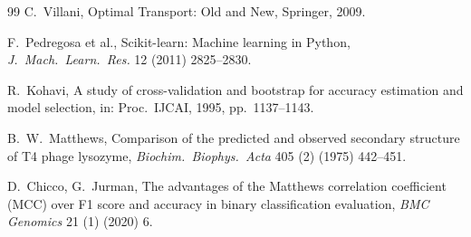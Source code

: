 \documentclass[preprint,12pt,authoryear]{elsarticle}
\begin{document}
\begin{thebibliography}{99}
C.~Villani, Optimal Transport: Old and New, Springer, 2009.

F.~Pedregosa et al., Scikit-learn: Machine learning in Python, \textit{J.\ Mach.\
Learn.\ Res.} 12 (2011) 2825--2830.

R.~Kohavi, A study of cross-validation and bootstrap for accuracy estimation and
model selection, in: Proc.\ IJCAI, 1995, pp.~1137--1143.

B.~W.~Matthews, Comparison of the predicted and observed secondary structure of T4
phage lysozyme, \textit{Biochim.\ Biophys.\ Acta} 405 (2) (1975) 442--451.

D.~Chicco, G.~Jurman, The advantages of the Matthews correlation coefficient (MCC)
over F1 score and accuracy in binary classification evaluation, \textit{BMC
Genomics} 21 (1) (2020) 6.

\end{thebibliography}
\end{document}
